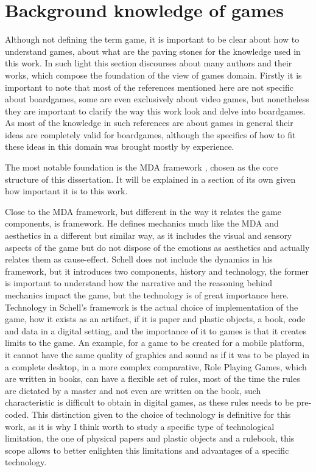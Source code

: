 \section{Background knowledge of games}

Although not defining the term game, it is important to be clear about how to understand games, about what are the paving stones for the knowledge used in this work. In such light this section discourses about many authors and their works, which compose the foundation of the view of games domain. Firstly it is important to note that most of the references mentioned here are not specific about boardgames, some are even exclusively about video games, but nonetheless they are important to clarify the way this work look and delve into boardgames. As most of the knowledge in such references are about games in general their ideas are completely valid for boardgames, although the specifics of how to fit these ideas in this domain was brought mostly by experience.

The most notable foundation is the MDA framework \cite{Hunicke2004}, chosen as the core structure of this dissertation. It will be explained in a section of its own given how important it is to this work.

Close to the MDA framework, but different in the way it relates the game components, is \cite{schell2014art} framework. He defines mechanics much like the MDA and aesthetics in a different but similar way, as it includes the visual and sensory aspects of the game but do not dispose of the emotions as aesthetics and actually relates them as cause-effect. Schell does not include the dynamics in his framework, but it introduces two components, history and technology, the former is important to understand how the narrative and the reasoning behind mechanics impact the game, but the technology is of great importance here. Technology in Schell's framework is the actual choice of implementation of the game, how it exists as an artifact, if it is paper and plastic objects, a book, code and data in a digital setting, and the importance of it to games is that it creates limits to the game. An example, for a game to be created for a mobile platform, it cannot have the same quality of graphics and sound as if it was to be played in a complete desktop, in a more complex comparative, Role Playing Games, which are written in books, can have a flexible set of rules, most of the time the rules are dictated by a master and not even are written on the book, such characteristic is difficult to obtain in digital games, as these rules needs to be pre-coded. This distinction given to the choice of technology is definitive for this work, as it is why I think worth to study a specific type of technological limitation, the one of physical papers and plastic objects and a rulebook, this scope allows to better enlighten this limitations and advantages of a specific technology.

